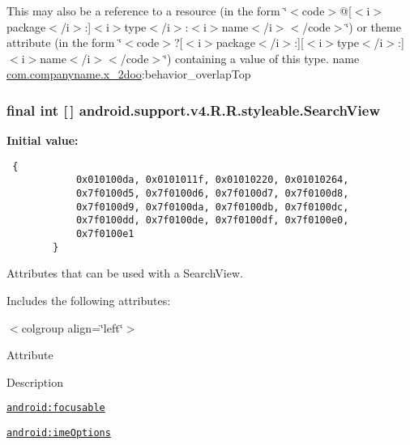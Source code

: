 This may also be a reference to a resource (in the form \char`\"{}$<$code$>$@\mbox{[}$<$i$>$package$<$/i$>$:\mbox{]}$<$i$>$type$<$/i$>$:$<$i$>$name$<$/i$>$$<$/code$>$\char`\"{}) or theme attribute (in the form \char`\"{}$<$code$>$?\mbox{[}$<$i$>$package$<$/i$>$:\mbox{]}\mbox{[}$<$i$>$type$<$/i$>$:\mbox{]}$<$i$>$name$<$/i$>$$<$/code$>$\char`\"{}) containing a value of this type.  name \hyperlink{namespacecom_1_1companyname_1_1x__2doo}{com.companyname.x\_\-2doo}:behavior\_\-overlapTop \hypertarget{classandroid_1_1support_1_1v4_1_1_r_1_1styleable_63a589da97c59fb7eebd9759edb31f0d}{
\subsubsection[{SearchView}]{\setlength{\rightskip}{0pt plus 5cm}final int \mbox{[}$\,$\mbox{]} android.support.v4.R.R.styleable.SearchView}}
\label{classandroid_1_1support_1_1v4_1_1_r_1_1styleable_63a589da97c59fb7eebd9759edb31f0d}


\textbf{Initial value:}

\begin{Code}\begin{verbatim} {
            0x010100da, 0x0101011f, 0x01010220, 0x01010264,
            0x7f0100d5, 0x7f0100d6, 0x7f0100d7, 0x7f0100d8,
            0x7f0100d9, 0x7f0100da, 0x7f0100db, 0x7f0100dc,
            0x7f0100dd, 0x7f0100de, 0x7f0100df, 0x7f0100e0,
            0x7f0100e1
        }
\end{verbatim}
\end{Code}
Attributes that can be used with a SearchView. 

Includes the following attributes: \begin{TabularC}{0}
\hline
\end{TabularC}
$<$colgroup align=\char`\"{}left\char`\"{}$>$ 

Attribute

Description 

{\tt \hyperlink{classandroid_1_1support_1_1v4_1_1_r_1_1styleable_e995a1e9fe744b38a1cd3db6e38b9003}{android:focusable}}

{\tt \hyperlink{classandroid_1_1support_1_1v4_1_1_r_1_1styleable_924ffeb8267d0e19f5948a2ccbf8b1b2}{android:imeOptions}}

